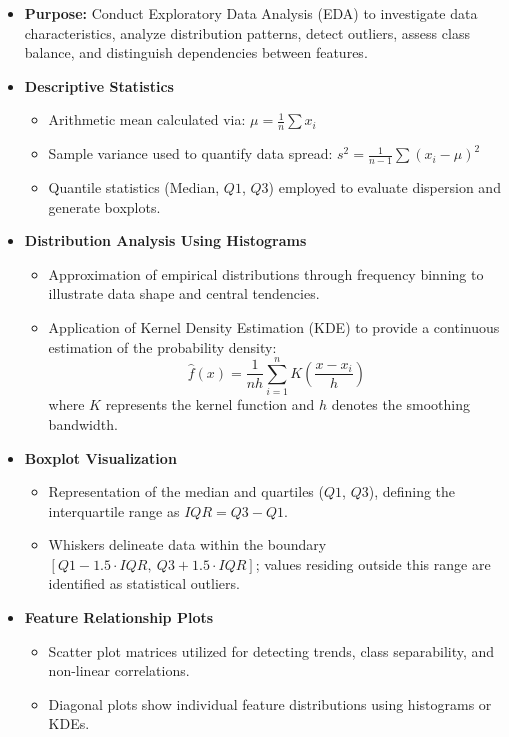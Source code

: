\documentclass[11pt]{article}
\begin{document}
\begin{itemize}
    \item \textbf{Purpose:} Conduct Exploratory Data Analysis (EDA) to investigate data characteristics, analyze distribution patterns, detect outliers, assess class balance, and distinguish dependencies between features.
     
    \item \textbf{Descriptive Statistics}
    \begin{itemize}
        \item Arithmetic mean calculated via: $\mu = \frac{1}{n} \sum x_i$
        \item Sample variance used to quantify data spread: $s^2 = \frac{1}{n-1} \sum (x_i - \mu)^2$
        \item Quantile statistics (Median, $Q1$, $Q3$) employed to evaluate dispersion and generate boxplots.
    \end{itemize}
     
    \item \textbf{Distribution Analysis Using Histograms}
    \begin{itemize}
        \item Approximation of empirical distributions through frequency binning to illustrate data shape and central tendencies.
        \item Application of Kernel Density Estimation (KDE) to provide a continuous estimation of the probability density:
        \[
        \hat{f}(x) = \frac{1}{nh} \sum_{i=1}^{n} K\left(\frac{x - x_i}{h}\right)
        \]
        where $K$ represents the kernel function and $h$ denotes the smoothing bandwidth.
    \end{itemize}
     
    \item \textbf{Boxplot Visualization}
    \begin{itemize}
        \item Representation of the median and quartiles ($Q1$, $Q3$), defining the interquartile range as $IQR = Q3 - Q1$.
        \item Whiskers delineate data within the boundary $[Q1 - 1.5 \cdot IQR, \ Q3 + 1.5 \cdot IQR]$; values residing outside this range are identified as statistical outliers.
    \end{itemize}
     
    \item \textbf{Feature Relationship Plots}
    \begin{itemize}
        \item Scatter plot matrices utilized for detecting trends, class separability, and non-linear correlations.
        \item Diagonal plots show individual feature distributions using histograms or KDEs.
    \end{itemize}
     

\end{itemize}
\end{document}
